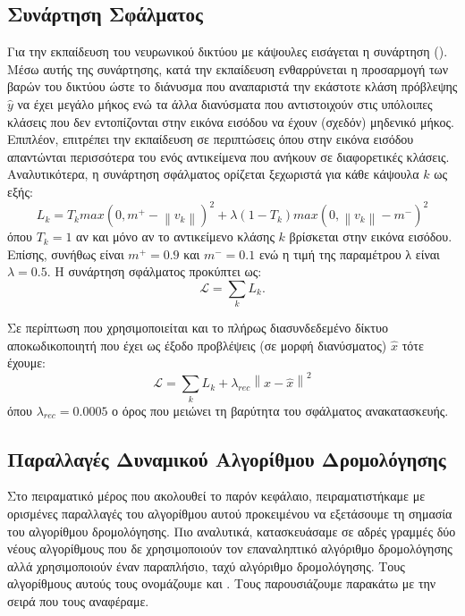 \subsection{Συνάρτηση Σφάλματος}
\label{sec:method1_loss_fn}
Για την εκπαίδευση του νευρωνικού δικτύου με κάψουλες εισάγεται η συνάρτηση  (). Μέσω αυτής της συνάρτησης, κατά την εκπαίδευση ενθαρρύνεται η προσαρμογή των βαρών του δικτύου ώστε το διάνυσμα  που αναπαριστά την εκάστοτε κλάση πρόβλεψης $\hat{y}$ να έχει μεγάλο μήκος ενώ τα άλλα διανύσματα που αντιστοιχούν στις υπόλοιπες κλάσεις που δεν εντοπίζονται στην εικόνα εισόδου να έχουν (σχεδόν) μηδενικό μήκος. Επιπλέον, επιτρέπει την εκπαίδευση σε περιπτώσεις όπου στην εικόνα εισόδου απαντώνται περισσότερα του ενός αντικείμενα που ανήκουν σε διαφορετικές κλάσεις. Αναλυτικότερα, η συνάρτηση σφάλματος ορίζεται ξεχωριστά για κάθε κάψουλα  $k$ ως εξής:
\begin{equation}
    L_k = T_k max(0, m^+ - \left\lVert v_k\right\rVert)^2 + \lambda (1-T_k) max(0, \left\lVert v_k\right\rVert - m^-)^2
\end{equation}
όπου $T_k = 1$ αν και μόνο αν το αντικείμενο κλάσης $k$ βρίσκεται στην εικόνα εισόδου. Επίσης, συνήθως είναι $m^+ = 0.9$ και $m^- = 0.1$ ενώ η τιμή της παραμέτρου λ είναι $\lambda = 0.5$. Η συνάρτηση σφάλματος προκύπτει ως: \begin{equation}
  \mathcal{L} = \sum_k L_k.
\end{equation}

Σε περίπτωση που χρησιμοποιείται και το πλήρως διασυνδεδεμένο δίκτυο αποκωδικοποιητή που έχει ως έξοδο προβλέψεις (σε μορφή διανύσματος) $\hat{x}$ τότε έχουμε: 
\begin{equation}
\mathcal{L} = \sum_k L_k + \lambda_{rec} \left\lVert x - \hat{x}\right\rVert^2 
\end{equation}
όπου $\lambda_{rec} = 0.0005$ ο όρος που μειώνει τη βαρύτητα του σφάλματος ανακατασκευής.

\subsection{Παραλλαγές Δυναμικού Αλγορίθμου Δρομολόγησης}

Στο πειραματικό μέρος που ακολουθεί το παρόν κεφάλαιο, πειραματιστήκαμε με ορισμένες παραλλαγές του αλγορίθμου αυτού προκειμένου να εξετάσουμε τη σημασία του αλγορίθμου δρομολόγησης. Πιο αναλυτικά, κατασκευάσαμε σε αδρές γραμμές δύο νέους αλγορίθμους που δε χρησιμοποιούν τον επαναληπτικό αλγόριθμο δρομολόγησης αλλά χρησιμοποιούν έναν παραπλήσιο, ταχύ αλγόριθμο δρομολόγησης. Τους αλγορίθμους αυτούς τους ονομάζουμε  και . Τους παρουσιάζουμε παρακάτω με την σειρά που τους αναφέραμε.

